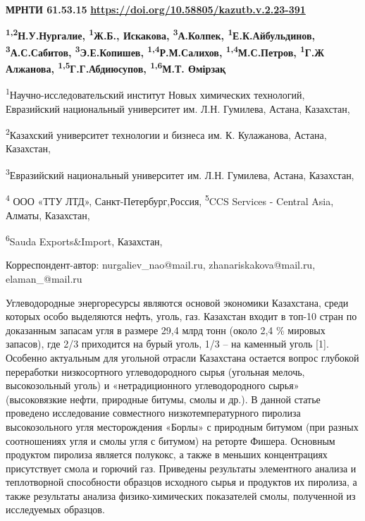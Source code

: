 \newpage
{\bfseries МРНТИ 61.53.15}
\hfill {\bfseries \href{https://doi.org/10.58805/kazutb.v.2.23-391}{https://doi.org/10.58805/kazutb.v.2.23-391}}


\begin{center}
{\bfseries \textsuperscript{1,2}Н.У.Нургалие, \textsuperscript{1}Ж.Б., Искакова, \textsuperscript{3}А.Колпек, \textsuperscript{1}Е.К.Айбульдинов, \textsuperscript{3}А.С.Сабитов, \textsuperscript{3}Э.Е.Копишев, \textsuperscript{1,4}Р.М.Салихов, \textsuperscript{1,4}М.С.Петров, \textsuperscript{1}Г.Ж Алжанова, \textsuperscript{1,5}Г.Г.Абдиюсупов, \textsuperscript{1,6}М.Т. Өмірзақ}

\textsuperscript{1}Научно-исследовательский институт Новых химических
технологий, Евразийский национальный университет им. Л.Н. Гумилева,
Астана, Казахстан,

\textsuperscript{2}Казахский университет технологии и бизнеса им. К.
Кулажанова, Астана, Казахстан,

\textsuperscript{3}Евразийский национальный университет им. Л.Н.
Гумилева, Астана, Казахстан,

\textsuperscript{4} ООО «ТТУ ЛТД», Санкт-Петербург,Россия,
\textsuperscript{5}CCS Services - Central Asia, Алматы, Казахстан,

\textsuperscript{6}Sauda Exports\&Import, Казахстан,

Корреспондент-автор: nurgaliev\_nao@mail.ru, zhanariskakova@mail.ru,
elaman\_@mail.ru
\end{center}

Углеводородные энергоре­сурсы являются основой экономики Казахстана,
среди которых особо выделяются нефть, уголь, газ. Казахстан входит в
топ-10 стран по доказанным запасам угля в размере 29,4 млрд тонн (около
2,4 \% мировых запасов), где 2/3 приходится на бурый уголь, 1/3 -- на
каменный уголь {[}1{]}. Особенно актуальным для угольной отрасли
Казахстана остается вопрос глубокой переработки низкосортного
углеводородного сырья (угольная мелочь, высокозольный уголь) и
«нетрадиционного углеводородного сырья» (высоковязкие нефти, природные
битумы, смолы и др.). В данной статье проведено исследование совместного
низкотемпературного пиролиза высокозольного угля месторождения «Борлы» с
природным битумом (при разных соотношениях угля и смолы угля с битумом)
на реторте Фишера. Основным продуктом пиролиза является полукокс, а
также в меньших концентрациях присутствует смола и горючий газ.
Приведены результаты элементного анализа и теплотворной способности
образцов исходного сырья и продуктов их пиролиза, а также результаты
анализа физико-химических показателей смолы, полученной из исследуемых
образцов.


